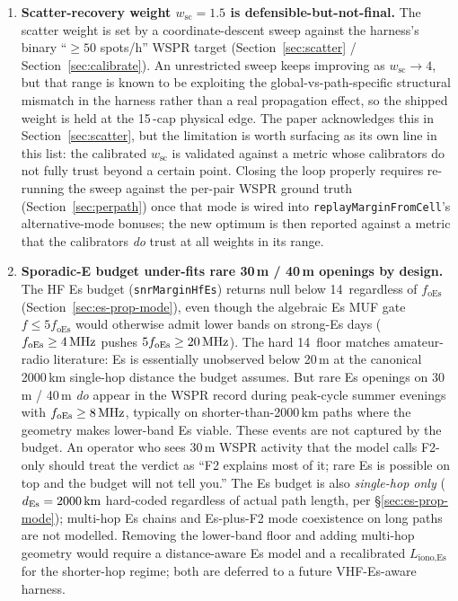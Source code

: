 \documentclass[11pt,a4paper]{article}
\newcommand{\SI}[2]{#1\,\text{#2}}
\newcommand{\dB}{\text{dB}}
\newcommand{\MHz}{\text{MHz}}
\newcommand{\km}{\text{km}}
\begin{document}
\begin{enumerate}[leftmargin=*]
  \item \textbf{Scatter-recovery weight $w_{\text{sc}} = 1.5$ is
        defensible-but-not-final.}  The scatter weight is set by a
        coordinate-descent sweep against the harness's binary
        ``$\geq 50$ spots/h'' WSPR target (Section~\ref{sec:scatter}
        / Section~\ref{sec:calibrate}).  An unrestricted sweep keeps
        improving as $w_{\text{sc}} \to 4$, but that range is known
        to be exploiting the global-vs-path-specific structural
        mismatch in the harness rather than a real propagation
        effect, so the shipped weight is held at the
        \SI{15}{\dB}-cap physical edge.  The paper acknowledges
        this in Section~\ref{sec:scatter}, but the limitation is
        worth surfacing as its own line in this list: the
        calibrated $w_{\text{sc}}$ is validated against a
        metric whose calibrators do not fully trust beyond a
        certain point.  Closing the loop properly requires
        re-running the sweep against the per-pair WSPR ground
        truth (Section~\ref{sec:perpath}) once that mode is wired
        into \texttt{replayMarginFromCell}'s alternative-mode bonuses; the
        new optimum is then reported against a metric that the
        calibrators \emph{do} trust at all weights in its range.

  \item \textbf{Sporadic-E budget under-fits rare 30\,m / 40\,m
        openings by design.}  The HF Es budget
        (\texttt{snrMarginHfEs}) returns null below \SI{14}{\MHz}
        regardless of $f_{\text{oEs}}$ (Section~\ref{sec:es-prop-mode}),
        even though the algebraic Es MUF gate $f \le 5 f_{\text{oEs}}$
        would otherwise admit lower bands on strong-Es days
        ($f_{\text{oEs}} \ge \SI{4}{\MHz}$ pushes
        $5 f_{\text{oEs}} \ge \SI{20}{\MHz}$).  The hard
        \SI{14}{\MHz} floor matches amateur-radio literature:
        Es is essentially unobserved below 20\,m at the canonical
        2000\,km single-hop distance the budget assumes.  But rare
        Es openings on 30\,m / 40\,m \emph{do} appear in the WSPR
        record during peak-cycle summer evenings with
        $f_{\text{oEs}} \ge \SI{8}{\MHz}$, typically on
        shorter-than-2000\,km paths where the geometry makes lower-band
        Es viable.  These events are not captured by the budget.
        An operator who sees 30\,m WSPR activity that the model
        calls F2-only should treat the verdict as ``F2 explains
        most of it; rare Es is possible on top and the budget will
        not tell you.''  The Es budget is also \emph{single-hop
        only} ($d_{\text{Es}} = \SI{2000}{\km}$ hard-coded
        regardless of actual path length, per
        \S\ref{sec:es-prop-mode}); multi-hop Es chains and
        Es-plus-F2 mode coexistence on long paths are not modelled.
        Removing the lower-band floor and adding multi-hop
        geometry would require a distance-aware Es model and a
        recalibrated $L_{\text{iono,Es}}$ for the shorter-hop
        regime; both are deferred to a future VHF-Es-aware
        harness.


\end{enumerate}
\end{document}
